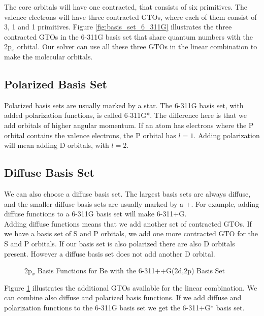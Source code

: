 \documentclass[a4paper,norsk,11pt,twoside]{report}
\begin{document}
The core orbitals will have one contracted, that consists of six
primitives. The valence electrons will have three contracted GTOs,
where each of them consist of 3, 1 and 1 primitives. Figure
\ref{fig:basis_set_6_311G} illustrates the three contracted GTOs in
the 6-311G basis set that share quantum numbers with the 2p$_x$
orbital. Our solver can use all these three GTOs in the linear
combination to make the molecular orbitals.

\subsection{Polarized Basis Set}
Polarized basis sets are usually marked by a star. The 6-311G basis
set, with added polarization functions, is called 6-311G*. The
difference here is that we add orbitals of higher angular momentum. If
an atom has electrons where the P orbital contains the valence
electrons, the P orbital has $l = 1$. Adding polarization will mean adding
D orbitals, with $l = 2$.

\subsection{Diffuse Basis Set}
We can also choose a diffuse basis set. The largest basis sets are
always diffuse, and the smaller diffuse basis sets are usually marked
by a +. For example, adding diffuse functions to a 6-311G basis set
will make 6-311+G. \\

Adding diffuse functions means that we add another set of contracted GTOs. If we have a basis set of S and P orbitals, we add one more contracted GTO for the S and P orbitals. If our basis set is also polarized there are also D orbitals present. However a diffuse basis set does not add another D orbital. \\

\begin{figure}[h!]
\begin{center}
\caption{2p$_x$ Basis Functions for Be with the 6-311++G(2d,2p) Basis Set}
\label{fig:basis_set_6_311++G}
\end{center}
\end{figure}

Figure \ref{fig:basis_set_6_311++G} illustrates the additional GTOs
available for the linear combination. We can combine also diffuse and
polarized basis functions. If we add diffuse and polarization
functions to the 6-311G basis set we get the 6-311+G* basis set. \\
\end{document}
